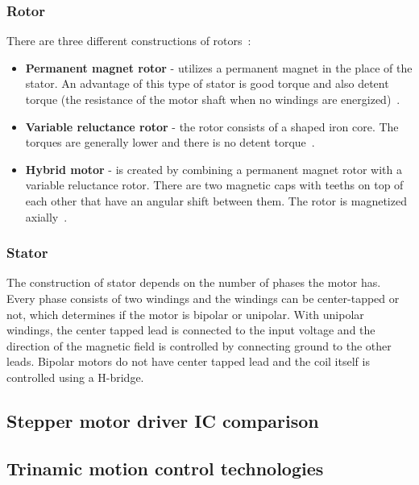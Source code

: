 \subsubsection{Rotor}
There are three different constructions of rotors~\cite{noauthor_stepper_nodate}:
\begin{itemize}
    \item \textbf{Permanent magnet rotor} - utilizes a permanent magnet in the place of the stator.
    An advantage of this type of stator is good torque and also detent torque (the resistance of the motor shaft when no windings are energized)~\cite{noauthor_stepper_nodate}.
    \item \textbf{Variable reluctance rotor} - the rotor consists of a shaped iron core.
    The torques are generally lower and there is no detent torque~\cite{noauthor_stepper_nodate}.
    \item \textbf{Hybrid motor} - is created by combining a permanent magnet rotor with a variable reluctance rotor.
    There are two magnetic caps with teeths on top of each other that have an angular shift between them.
    The rotor is magnetized axially~\cite{noauthor_stepper_nodate}.
\end{itemize}

\subsubsection{Stator}
The construction of stator depends on the number of phases the motor has.
Every phase consists of two windings and the windings can be center-tapped or not, which determines if the motor is bipolar or unipolar.
With unipolar windings, the center tapped lead is connected to the input voltage and the direction of the magnetic field is controlled by connecting ground to the other leads.
Bipolar motors do not have center tapped lead and the coil itself is controlled using a H-bridge.

\subsection{Stepper motor driver IC comparison}
\label{subsec:stepper_ic}

\subsection{Trinamic motion control technologies}
\label{subsec:trinamic_tech}

